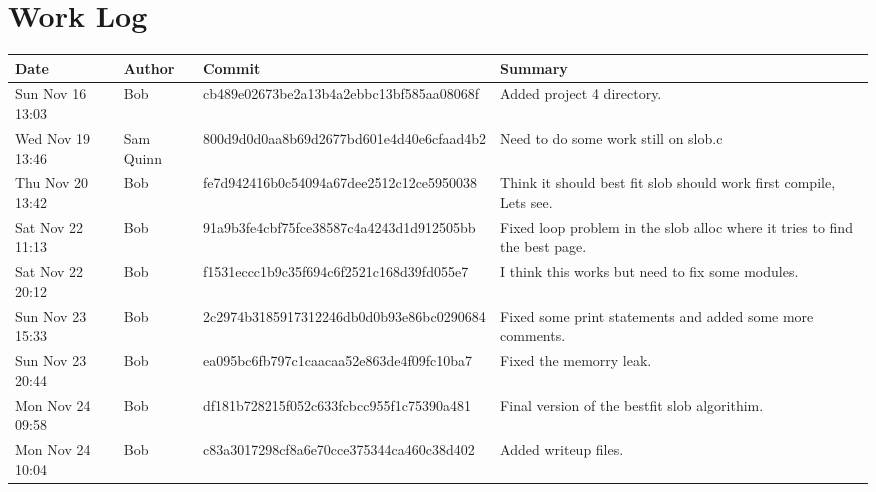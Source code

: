 \documentclass[letterpaper,10pt,notitlepage,fleqn]{article}
\begin{document}
\section*{Work Log}

\begin{center}
    \begin{tabular}{| p{3cm} | l | l | p{5cm} |}
        \hline
        \textbf{Date} & \textbf{Author} & \textbf{Commit} & \textbf{Summary} \\ \hline
        Sun Nov 16 13:03 & Bob & cb489e02673be2a13b4a2ebbc13bf585aa08068f & Added project 4 directory.
        \\ \hline
       Wed Nov 19 13:46 & Sam Quinn & 800d9d0d0aa8b69d2677bd601e4d40e6cfaad4b2 & Need to do some work still on slob.c
        \\ \hline
        Thu Nov 20 13:42 & Bob & fe7d942416b0c54094a67dee2512c12ce5950038 & Think it should best fit slob should work first compile, Lets see.
        \\ \hline
        Sat Nov 22 11:13 & Bob & 91a9b3fe4cbf75fce38587c4a4243d1d912505bb & Fixed loop problem in the slob alloc where it tries to find the best page.
        \\ \hline
        Sat Nov 22 20:12 & Bob & f1531eccc1b9c35f694c6f2521c168d39fd055e7 & I think this works but need to fix some modules.
        \\ \hline
        Sun Nov 23 15:33 & Bob & 2c2974b3185917312246db0d0b93e86bc0290684 & Fixed some print statements and added some more comments.
        \\ \hline
        Sun Nov 23 20:44 & Bob & ea095bc6fb797c1caacaa52e863de4f09fc10ba7 & Fixed the memorry leak.
        \\ \hline
        Mon Nov 24 09:58 & Bob & df181b728215f052c633fcbcc955f1c75390a481 & Final version of the bestfit slob algorithim.
        \\ \hline
        Mon Nov 24 10:04 & Bob & c83a3017298cf8a6e70cce375344ca460c38d402 & Added writeup files.
        \\ \hline
    \end{tabular}
\end{center}
\end{document}
